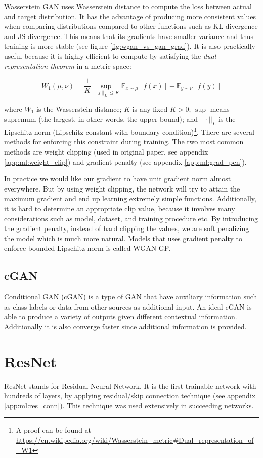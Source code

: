 Wasserstein GAN uses Wasserstein distance to compute the loss between actual and target distribution. It has the advantage of producing more consistent values when comparing distributions compared to other functions such as KL-divergence and JS-divergence. This means that its gradients have smaller variance and thus training is more stable (see figure \ref{fig:wgan_vs_gan_grad}). It is also practically useful because it is highly efficient to compute by satisfying the \textit{dual representation theorem} in a metric space:

$$
W_{1}(\mu, \nu)=\frac{1}{K} \sup _{\|f\|_{L} \leq K} \mathbb{E}_{x \sim \mu}[f(x)]-\mathbb{E}_{y \sim \nu}[f(y)]
$$

where $W_1$ is the Wasserstein distance; $K$ is any fixed $K > 0$; $\sup$ means supremum (the largest, in other words, the upper bound); and $||\cdot||_L$ is the Lipschitz norm (Lipschitz constant with boundary condition)\footnote{A proof can be found at \url{https://en.wikipedia.org/wiki/Wasserstein\_metric\#Dual\_representation\_of\_W1}}. There are several methods for enforcing this constraint during training. The two most common methods are weight clipping (used in original paper, see appendix \ref{app:ml:weight_clip}) and gradient penalty (see appendix \ref{app:ml:grad_pen}).

In practice we would like our gradient to have unit gradient norm almost everywhere. But by using weight clipping, the network will try to attain the maximum gradient and end up learning extremely simple functions\cite{gulrajaniImprovedTrainingWasserstein2017}. Additionally, it is hard to determine an appropriate clip value, because it involves many considerations such as model, dataset, and training procedure etc. By introducing the gradient penalty, instead of hard clipping the values, we are soft penalizing the model which is much more natural. Models that uses gradient penalty to enforce bounded Lipschitz norm is called WGAN-GP.

\subsection{cGAN}
Conditional GAN (cGAN) is a type of GAN that have auxiliary information such as class labels or data from other sources as additional input. An ideal cGAN is able to produce a variety of outputs given different contextual information. Additionally it is also converge faster since additional information is provided.

\section{ResNet}
ResNet stands for Residual Neural Network. It is the first trainable network with hundreds of layers, by applying residual/skip connection technique (see appendix \ref{app:ml:res_conn}). This technique was used extensively in succeeding networks.

